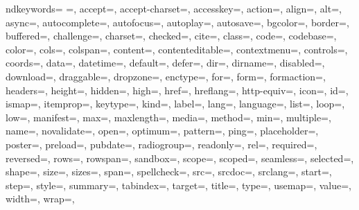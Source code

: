 {    ndkeywords={ %
            =,
accept=, accept-charset=, accesskey=, action=, align=, alt=, async=, autocomplete=, autofocus=, autoplay=, autosave=, bgcolor=, border=, buffered=, challenge=, charset=, checked=, cite=, class=, code=, codebase=, color=, cols=, colspan=, content=, contenteditable=, contextmenu=, controls=, coords=, data=, datetime=, default=, defer=, dir=, dirname=, disabled=, download=, draggable=, dropzone=, enctype=, for=, form=, formaction=, headers=, height=, hidden=, high=, href=, hreflang=, http-equiv=, icon=, id=, ismap=, itemprop=, keytype=, kind=, label=, lang=, language=, list=, loop=, low=, manifest=, max=, maxlength=, media=, method=, min=, multiple=, name=, novalidate=, open=, optimum=, pattern=, ping=, placeholder=, poster=, preload=, pubdate=, radiogroup=, readonly=, rel=, required=, reversed=, rows=, rowspan=, sandbox=, scope=, scoped=, seamless=, selected=, shape=, size=, sizes=, span=, spellcheck=, src=, srcdoc=, srclang=, start=, step=, style=, summary=, tabindex=, target=, title=, type=, usemap=, value=, width=, wrap=,
}}
